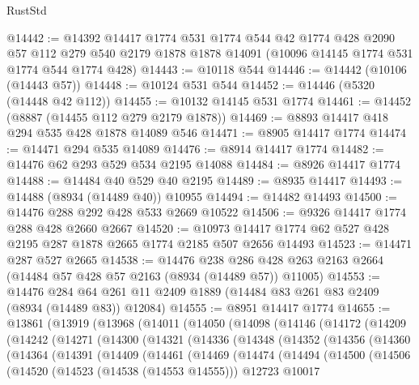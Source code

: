 \begin{lexlean}{RustStd}
\begin{coremodule}
@14442 := @14392
    @14417
    @1774
    @531
    @1774
    @544
    @42
    @1774
    @428
    @2090
    @57
    @112
    @279
    @540
    @2179
    @1878
    @1878
    @14091
    (@10096 @14145 @1774 @531 @1774 @544 @1774 @428)
@14443 := @10118 @544
@14446 := @14442 (@10106 (@14443 @57))
@14448 := @10124 @531 @544
@14452 := @14446 (@5320 (@14448 @42 @112))
@14455 := @10132 @14145 @531 @1774
@14461 := @14452 (@8887 (@14455 @112 @279 @2179 @1878))
@14469 := @8893 @14417 @418 @294 @535 @428 @1878 @14089 @546
@14471 := @8905 @14417 @1774
@14474 := @14471 @294 @535 @14089
@14476 := @8914 @14417 @1774
@14482 := @14476 @62 @293 @529 @534 @2195 @14088
@14484 := @8926 @14417 @1774
@14488 := @14484 @40 @529 @40 @2195
@14489 := @8935 @14417
@14493 := @14488 (@8934 (@14489 @40)) @10955
@14494 := @14482 @14493
@14500 := @14476 @288 @292 @428 @533 @2669 @10522
@14506 := @9326 @14417 @1774 @288 @428 @2660 @2667
@14520 := @10973 @14417 @1774 @62 @527 @428 @2195 @287 @1878 @2665 @1774 @2185 @507 @2656 @14493
@14523 := @14471 @287 @527 @2665
@14538 := @14476
    @238
    @286
    @428
    @263
    @2163
    @2664
    (@14484 @57 @428 @57 @2163 (@8934 (@14489 @57)) @11005)
@14553 := @14476
    @284
    @64
    @261
    @11
    @2409
    @1889
    (@14484 @83 @261 @83 @2409 (@8934 (@14489 @83)) @12084)
@14555 := @8951 @14417 @1774
@14655 := @13861
    (@13919
      (@13968
        (@14011
          (@14050
            (@14098
              (@14146
                (@14172
                  (@14209
                    (@14242
                      (@14271
                        (@14300
                          (@14321
                            (@14336
                              (@14348
                                (@14352
                                  (@14356
                                    (@14360
                                      (@14364
                                        (@14391
                                          (@14409
                                            (@14461
                                              (@14469
                                                (@14474
                                                  (@14494
                                                    (@14500
                                                      (@14506
                                                        (@14520
                                                          (@14523 (@14538 (@14553 @14555)))
                                                          @12723
                                                          @10017

\end{coremodule}
\end{lexlean}
